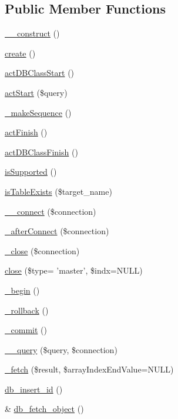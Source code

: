 \subsection*{Public Member Functions}
\begin{DoxyCompactItemize}
\item 
\hyperlink{classDBCubridConnectWrapper_a1fb631b5c64dc57fc47c1edf2a119c07}{\+\_\+\+\_\+construct} ()
\item 
\hyperlink{classDBCubridConnectWrapper_a545164e4627865cfb2725a65bcd87605}{create} ()
\item 
\hyperlink{classDBCubridConnectWrapper_af8358bd33215f81e51aa8683e3e9d18a}{act\+D\+B\+Class\+Start} ()
\item 
\hyperlink{classDBCubridConnectWrapper_a4a25b7180667bba108d9d206d830305d}{act\+Start} (\$query)
\item 
\hyperlink{classDBCubridConnectWrapper_ac59c3b74f8eb6c51dd6b2dcc136441ab}{\+\_\+make\+Sequence} ()
\item 
\hyperlink{classDBCubridConnectWrapper_a0cc9f50dc8759a5d0d44ef3992654b68}{act\+Finish} ()
\item 
\hyperlink{classDBCubridConnectWrapper_aeb7f35fad0a35c3df99eda5ff1c4ef03}{act\+D\+B\+Class\+Finish} ()
\item 
\hyperlink{classDBCubridConnectWrapper_a2e0cb434041dab8243f978b7f20b29bf}{is\+Supported} ()
\item 
\hyperlink{classDBCubridConnectWrapper_a085ebee6e25b02aab171fa70b7ee0fba}{is\+Table\+Exists} (\$target\+\_\+name)
\item 
\hyperlink{classDBCubridConnectWrapper_afb3e68a86eda27de94652eaddfd99954}{\+\_\+\+\_\+connect} (\$connection)
\item 
\hyperlink{classDBCubridConnectWrapper_aed3cc4440b05809edba612141c925063}{\+\_\+after\+Connect} (\$connection)
\item 
\hyperlink{classDBCubridConnectWrapper_ac55361083a1d02ac4f7b11e58e16ab79}{\+\_\+close} (\$connection)
\item 
\hyperlink{classDBCubridConnectWrapper_ae4d82f05776b8db4f968bb21de168f69}{close} (\$type= 'master', \$indx=N\+U\+L\+L)
\item 
\hyperlink{classDBCubridConnectWrapper_ae08cdaeed47029a0e43c850781f95ad3}{\+\_\+begin} ()
\item 
\hyperlink{classDBCubridConnectWrapper_ade06a2b930f3f7b98d7aa751049ed9b2}{\+\_\+rollback} ()
\item 
\hyperlink{classDBCubridConnectWrapper_a9599295a1d4c266d5c35e4a556fe81ce}{\+\_\+commit} ()
\item 
\hyperlink{classDBCubridConnectWrapper_a87bc2988be5745c1afa403333d57cd38}{\+\_\+\+\_\+query} (\$query, \$connection)
\item 
\hyperlink{classDBCubridConnectWrapper_ac02b952edc791b01253f9c5db2dbcf85}{\+\_\+fetch} (\$result, \$array\+Index\+End\+Value=N\+U\+L\+L)
\item 
\hyperlink{classDBCubridConnectWrapper_ae2a7172776b5e9d645ed1bdba55b2180}{db\+\_\+insert\+\_\+id} ()
\item 
\& \hyperlink{classDBCubridConnectWrapper_a210e6a694ed2bb6b80d102065393040b}{db\+\_\+fetch\+\_\+object} ()
\end{DoxyCompactItemize}
